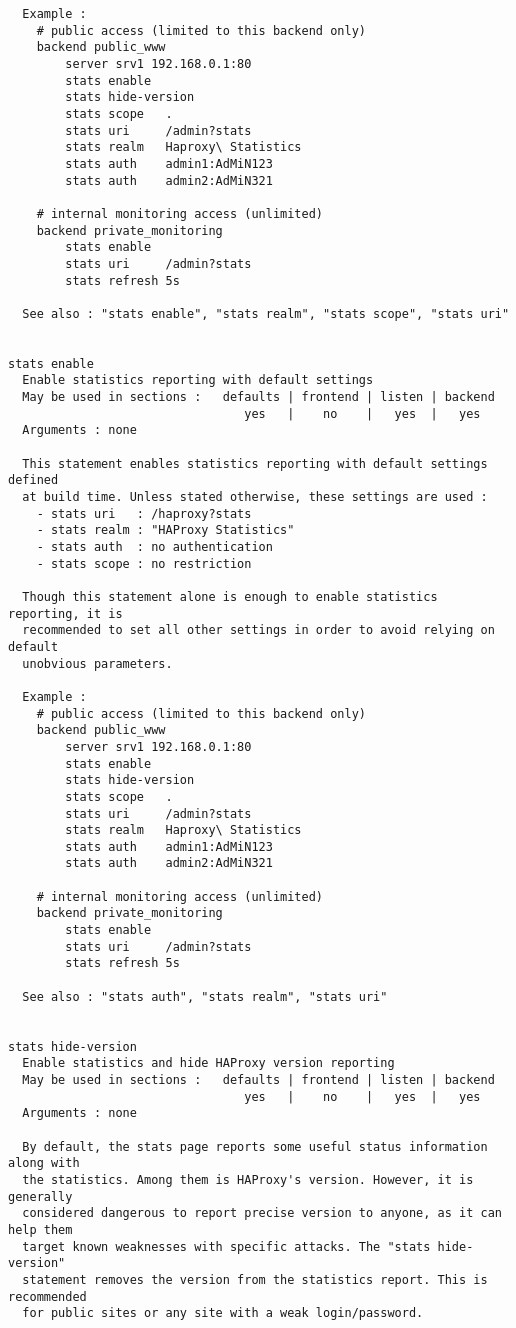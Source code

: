 \begin{verbatim}
  Example :
    # public access (limited to this backend only)
    backend public_www
        server srv1 192.168.0.1:80
        stats enable
        stats hide-version
        stats scope   .
        stats uri     /admin?stats
        stats realm   Haproxy\ Statistics
        stats auth    admin1:AdMiN123
        stats auth    admin2:AdMiN321

    # internal monitoring access (unlimited)
    backend private_monitoring
        stats enable
        stats uri     /admin?stats
        stats refresh 5s

  See also : "stats enable", "stats realm", "stats scope", "stats uri"


stats enable
  Enable statistics reporting with default settings
  May be used in sections :   defaults | frontend | listen | backend
                                 yes   |    no    |   yes  |   yes
  Arguments : none

  This statement enables statistics reporting with default settings defined
  at build time. Unless stated otherwise, these settings are used :
    - stats uri   : /haproxy?stats
    - stats realm : "HAProxy Statistics"
    - stats auth  : no authentication
    - stats scope : no restriction

  Though this statement alone is enough to enable statistics reporting, it is
  recommended to set all other settings in order to avoid relying on default
  unobvious parameters.

  Example :
    # public access (limited to this backend only)
    backend public_www
        server srv1 192.168.0.1:80
        stats enable
        stats hide-version
        stats scope   .
        stats uri     /admin?stats
        stats realm   Haproxy\ Statistics
        stats auth    admin1:AdMiN123
        stats auth    admin2:AdMiN321

    # internal monitoring access (unlimited)
    backend private_monitoring
        stats enable
        stats uri     /admin?stats
        stats refresh 5s

  See also : "stats auth", "stats realm", "stats uri"


stats hide-version
  Enable statistics and hide HAProxy version reporting
  May be used in sections :   defaults | frontend | listen | backend
                                 yes   |    no    |   yes  |   yes
  Arguments : none

  By default, the stats page reports some useful status information along with
  the statistics. Among them is HAProxy's version. However, it is generally
  considered dangerous to report precise version to anyone, as it can help them
  target known weaknesses with specific attacks. The "stats hide-version"
  statement removes the version from the statistics report. This is recommended
  for public sites or any site with a weak login/password.


\end{verbatim}
